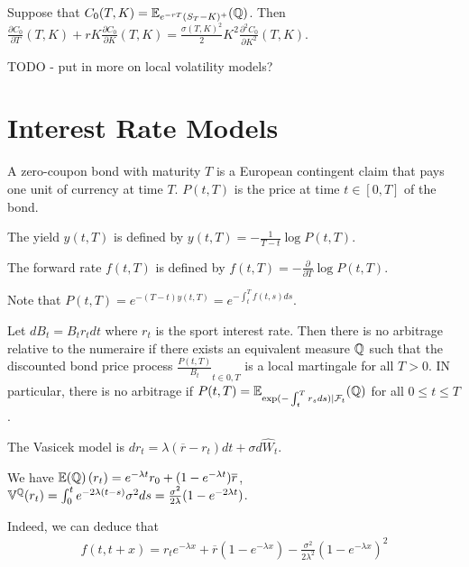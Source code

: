 \begin{thm}
  \label{sec:hedg-cont-claims-4}
  Suppose that $C_{0}(T, K) = \E{\Q}{e^{-rT}(S_{T} - K)^{+}}$.  Then
  $\frac{\partial C_{0}}{\partial T}(T, K) + rK \frac{\partial
    C_{0}}{\partial K}(T, K) = \frac{\sigma(T, K)^{2}}{2} K^{2}
  \frac{\partial^{2} C_{0}}{\partial K^{2}}(T, K)$.
\end{thm}

TODO - put in more on local volatility models?

\section{Interest Rate Models}
\label{sec:interest-rate-models}
\begin{defn}
  \label{sec:interest-rate-models-1}
  A zero-coupon bond with maturity $T$ is a European contingent claim
  that pays one unit of currency at time $T$.  $P(t, T)$ is the price
  at time $t \in [0, T]$ of the bond.

  The yield $y(t, T)$ is defined by $y(t, T) = - \frac{1}{T- t} \log
  P(t, T)$.

  The forward rate $f(t, T)$ is defined by $f(t, T) = -
  \frac{\partial}{\partial T} \log P(t, T)$.

  Note that $P(t, T) = e^{-(T-t) y(t, T)} = e^{-\int_{t}^{T} f(t, s)
    ds}$.
\end{defn}

\begin{thm}
  \label{sec:interest-rate-models-3}
  Let $dB_{t} = B_{t} r_{t} dt$ where $r_{t}$ is the sport interest
  rate.  Then there is no arbitrage relative to the numeraire if there
  exists an equivalent measure $\Q$ such that the discounted bond
  price process $\frac{P(t, T)}{B_{t}}_{t \in 0, T}$ is a local
  martingale for all $T > 0$.  IN particular, there is no arbitrage if
  $P(t, T) = \E{\Q}{\exp(-\int_{t}^{T} r_{s} ds) | \mathcal{F}_{t}}$
  for all $0 \leq t \leq T$.
\end{thm}

\begin{defn}
  \label{sec:interest-rate-models-4}
  The Vasicek model is $dr_{t} = \lambda(\overline r - r_{t}) dt +
  \sigma d\hat W_{t}$.

  We have $\E{\Q}(r_{t}) = e^{-\lambda t} r_{0} + (1 - e^{-\lambda t})
  \overline r$, $\Var^{\Q}(r_{t}) = \int_{0}^{t} e^{-2\lambda(t-s)}
  \sigma^{2} ds = \frac{\sigma^{2}}{2\lambda} (1 - e^{-2\lambda t})$.

  Indeed, we can deduce that
  \begin{align}
    \label{eq:28}
    f(t, t + x) = r_{t} e^{-\lambda x} + \overline r(1 - e^{-\lambda
      x}) - \frac{\sigma^{2}}{2 \lambda^{2}} (1 - e^{-\lambda x})^{2}
  \end{align}
\end{defn}

